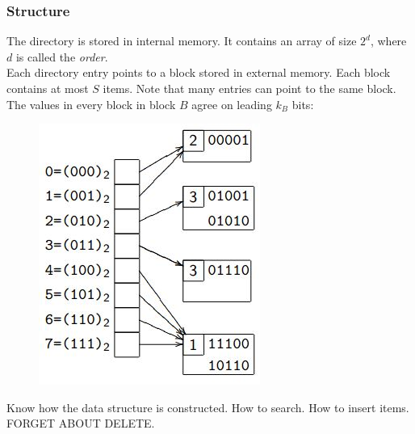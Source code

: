 \documentclass{report}
\begin{document}
\subsubsection{Structure}
The directory is stored in internal memory. It contains an array of size $2^d$, where $d$ is called the \textit{order}.\\
Each directory entry points to a block stored in external memory. Each block contains at most $S$ items. Note that many entries can point to the same block. The values in every block in block $B$ agree on leading $k_B$ bits:
\begin{figure}[ht]
\begin{center}
\includegraphics[scale=0.7]{hash.jpg}
\end{center}
\end{figure}
Know how the data structure is constructed. How to search. How to insert items. FORGET ABOUT DELETE.
\end{document}
